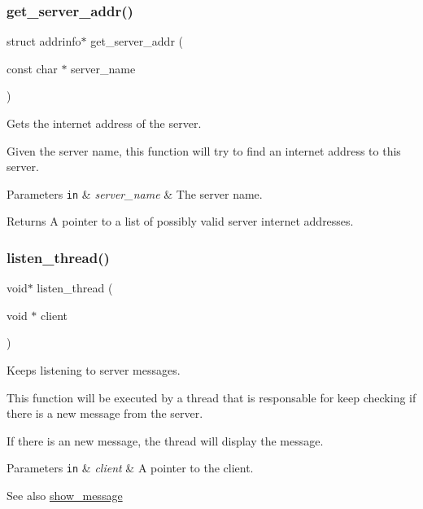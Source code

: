 \subsubsection{\texorpdfstring{get\+\_\+server\+\_\+addr()}{get\_server\_addr()}}
{\footnotesize\ttfamily struct addrinfo$\ast$ get\+\_\+server\+\_\+addr (\begin{DoxyParamCaption}\item[{const char $\ast$}]{server\+\_\+name }\end{DoxyParamCaption})}



Gets the internet address of the server. 

Given the server name, this function will try to find an internet address to this server.


\begin{DoxyParams}[1]{Parameters}
\mbox{\tt in}  & {\em server\+\_\+name} & The server name.\\
\hline
\end{DoxyParams}
\begin{DoxyReturn}{Returns}
A pointer to a list of possibly valid server internet addresses. 
\end{DoxyReturn}
\mbox{\label{zip-zop-client_8c_aafa1438575f3295609976f35a6518cca}} 
\subsubsection{\texorpdfstring{listen\+\_\+thread()}{listen\_thread()}}
{\footnotesize\ttfamily void$\ast$ listen\+\_\+thread (\begin{DoxyParamCaption}\item[{void $\ast$}]{client }\end{DoxyParamCaption})}



Keeps listening to server messages. 

This function will be executed by a thread that is responsable for keep checking if there is a new message from the server.

If there is an new message, the thread will display the message.


\begin{DoxyParams}[1]{Parameters}
\mbox{\tt in}  & {\em client} & A pointer to the client.\\
\hline
\end{DoxyParams}
\begin{DoxySeeAlso}{See also}
\hyperlink{zip-zop-client_8c_aec5550cf115ba01d0da023ba9d1876bb}{show\+\_\+message} 
\end{DoxySeeAlso}
\mbox{\label{zip-zop-client_8c_a3c04138a5bfe5d72780bb7e82a18e627}} 
